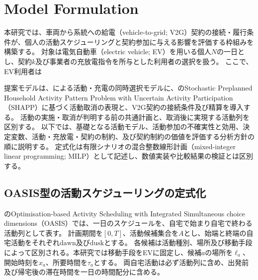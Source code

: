 \section{Model Formulation}
\label{sec:model_formulation}
\allowdisplaybreaks[1]

本研究では、車両から系統への給電（vehicle-to-grid; V2G）契約の接続・履行条件が、個人の活動スケジューリングと契約参加に与える影響を評価する枠組みを構築する。
対象は電気自動車（electric vehicle; EV）を用いる個人$N$の一日とし、契約$k$及び事業者の充放電指令を所与とした利用者の選択を扱う。
ここで、EV利用者は

提案モデルは、\citet{wang2025joint}による活動・充電の同時選択モデルに、\citet{gan2013stochastic}のStochastic Preplanned Household Activity Pattern Problem with Uncertain Activity Participation（SHAPP）に基づく活動取消の表現と、V2G契約の接続条件及び精算を導入する。
活動の実施・取消が判明する前の共通計画と、取消後に実現する活動列を区別する。
以下では、基礎となる活動モデル、活動参加の不確実性と効用、決定変数、活動・充放電・契約の制約、及び契約制約の価値を評価する分析方針の順に説明する。
定式化は有限シナリオの混合整数線形計画（mixed-integer linear programming; MILP）として記述し、数値実装や比較結果の検証とは区別する。

\subsection{OASIS型の活動スケジューリングの定式化}
\label{subsec:oasis_formulation}

\citet{pougala2023oasis}のOptimisation-based Activity Scheduling with Integrated Simultaneous choice dimensions（OASIS）では、一日のスケジュールを、自宅で始まり自宅で終わる活動列として表す。
計画期間を$[0,T]$、活動候補集合を$A$とし、始端と終端の自宅活動をそれぞれ$\mathrm{dawn}$及び$\mathrm{dusk}$とする。
各候補は活動種別、場所及び移動手段によって区別される。本研究では移動手段をEVに固定し、候補$a$の場所を$\ell_a$、開始時刻を$x_a$、所要時間を$\tau_a$とする。
両自宅活動は必ず活動列に含め、出発前及び帰宅後の滞在時間を一日の時間配分に含める。

